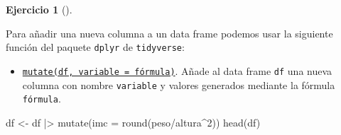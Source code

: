 \documentclass[
  a4paper,
]{scrreport}
\newenvironment{Shaded}{\begin{snugshade}}{\end{snugshade}}
\newcommand{\AttributeTok}[1]{\textcolor[rgb]{0.40,0.45,0.13}{#1}}
\newcommand{\DecValTok}[1]{\textcolor[rgb]{0.68,0.00,0.00}{#1}}
\newcommand{\FunctionTok}[1]{\textcolor[rgb]{0.28,0.35,0.67}{#1}}
\newcommand{\NormalTok}[1]{\textcolor[rgb]{0.00,0.23,0.31}{#1}}
\newcommand{\OtherTok}[1]{\textcolor[rgb]{0.00,0.23,0.31}{#1}}
\newcommand{\SpecialCharTok}[1]{\textcolor[rgb]{0.37,0.37,0.37}{#1}}
\providecommand{\tightlist}{%
  \setlength{\itemsep}{0pt}\setlength{\parskip}{0pt}}\usepackage{longtable,booktabs,array}
\theoremstyle{definition}
\newtheorem{exercise}{Ejercicio}[chapter]
\theoremstyle{remark}
\begin{document}
\begin{exercise}[]
\begin{enumerate}
\begin{tcolorbox}
  Para añadir una nueva columna a un data frame podemos usar la
  siguiente función del paquete \texttt{dplyr} de \texttt{tidyverse}:

  \begin{itemize}
  \tightlist
  \item
    \href{https://dplyr.tidyverse.org/reference/mutate.html}{\texttt{mutate(df,\ variable\ =\ fórmula)}}.
    Añade al data frame \texttt{df} una nueva columna con nombre
    \texttt{variable} y valores generados mediante la fórmula
    \texttt{fórmula}.
  \end{itemize}

\begin{Shaded}
\begin{Highlighting}[]
\NormalTok{df }\OtherTok{\textless{}{-}}\NormalTok{ df }\SpecialCharTok{|\textgreater{}} \FunctionTok{mutate}\NormalTok{(}\AttributeTok{imc =} \FunctionTok{round}\NormalTok{(peso}\SpecialCharTok{/}\NormalTok{altura}\SpecialCharTok{\^{}}\DecValTok{2}\NormalTok{))}
\FunctionTok{head}\NormalTok{(df)}
\end{Highlighting}
\end{Shaded}


\end{tcolorbox}
\end{enumerate}
\end{exercise}
\end{document}
